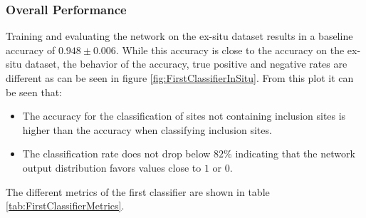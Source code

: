 
\subsubsection{Overall Performance}

Training and evaluating the network on the ex-situ dataset results in a baseline accuracy of $0.948\pm 0.006$. While this accuracy is close to the accuracy on the ex-situ dataset, the behavior of the accuracy, true positive and negative rates are different as can be seen in figure \ref{fig:FirstClassifierInSitu}. From this plot it can be seen that:
\begin{itemize}
\item The accuracy for the classification of sites not containing inclusion sites is higher than the accuracy when classifying inclusion sites. 
\item The classification rate does not drop below $82\%$ indicating that the network output distribution favors values close to $1$ or $0$.
\end{itemize}
The different metrics of the first classifier are shown in table \ref{tab:FirstClassifierMetrics}.


